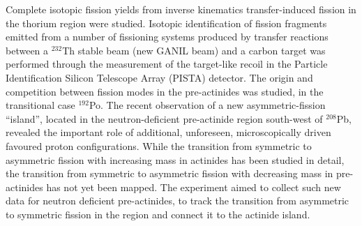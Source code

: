 Complete isotopic fission yields from inverse kinematics transfer-induced fission in the thorium region were studied. Isotopic identification of fission fragments emitted from a number of fissioning systems produced by transfer reactions between a $^{232}$Th stable beam (new GANIL beam) and a carbon target was performed through the measurement of the target-like recoil in the Particle Identification Silicon Telescope Array (PISTA) detector.  The origin and competition between fission modes in the pre-actinides was studied, in the transitional case $^{192}$Po. The recent observation of a new asymmetric-fission “island”, located in the neutron-deficient pre-actinide region south-west of $^{208}$Pb, revealed the important role of additional, unforeseen, microscopically driven favoured proton configurations. While the transition from symmetric to asymmetric fission with increasing mass in actinides has been studied in detail, the transition from symmetric to asymmetric fission with decreasing mass in pre-actinides has not yet been mapped. The experiment aimed to collect such new data for neutron deficient pre-actinides, to track the transition from asymmetric to symmetric fission in the region and connect it to the actinide island. 

